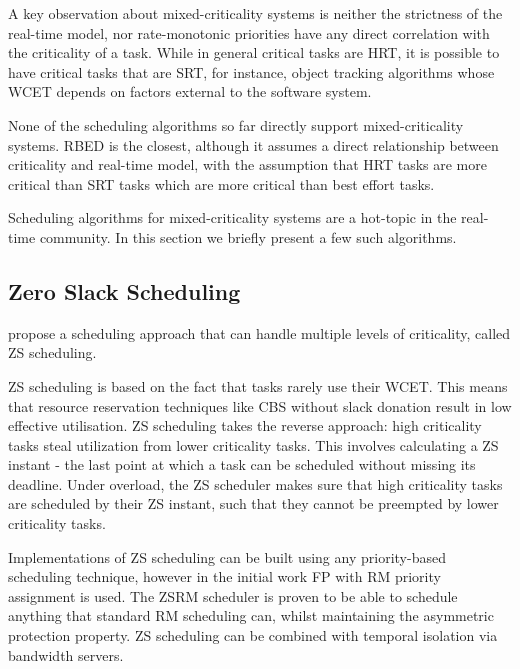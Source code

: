 A key observation about mixed-criticality systems is neither the strictness of the real-time model, nor rate-monotonic priorities have any direct correlation with the criticality of a task.
While in general critical tasks are \gls{HRT}, it is possible to have critical tasks that are \gls{SRT}, for instance, object tracking algorithms whose \gls{WCET} depends on factors external to the software system.

None of the scheduling algorithms so far directly support mixed-criticality systems.
\gls{RBED} is the closest, although it assumes a direct relationship between criticality and real-time model, with the assumption that \gls{HRT} tasks are more critical than \gls{SRT} tasks which are more critical than best effort tasks.

Scheduling algorithms for mixed-criticality systems are a hot-topic in the real-time community.
In this section we briefly present a few such algorithms.


\subsection{Zero Slack Scheduling}

 propose a scheduling approach that can handle multiple levels of criticality, called \gls{ZS} scheduling.

\gls{ZS} scheduling is based on the fact that tasks rarely use their \gls{WCET}.
This means that resource reservation techniques like \gls{CBS} without slack donation result in low effective utilisation.
ZS scheduling takes the reverse approach: high criticality tasks steal utilization from lower criticality tasks.
This involves calculating a \gls{ZS} instant - the last point at which a task can be scheduled without missing its deadline.
Under overload, the \gls{ZS} scheduler makes sure that high criticality tasks are scheduled by their \gls{ZS} instant, such that they cannot be preempted by lower criticality tasks.

Implementations of \gls{ZS} scheduling can be built using any priority-based scheduling technique, however in the initial work \gls{FP} with \gls{RM} priority assignment is used.
The \gls{ZS}\gls{RM} scheduler is proven to be able to schedule anything that standard \gls{RM} scheduling can, whilst maintaining the asymmetric protection property.
\gls{ZS} scheduling can be combined with temporal isolation via bandwidth servers.

